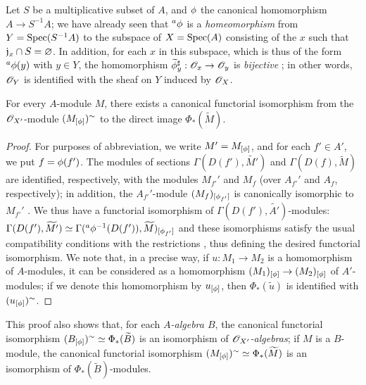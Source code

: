 \begin{example}[1.6.2]
\label{I.1.6.2}
Let $S$ be a multiplicative subset of $A$, and $\phi$ the canonical homomorphism $A\to S^{-1}A$;
we have already seen  that ${}^a\phi$ is a \emph{homeomorphism} from $Y=\operatorname{Spec}(S^{-1}A)$ to the subspace of $X=\operatorname{Spec}(A)$ consisting of the $x$ such that $\mathfrak{j}_x\cap S=\varnothing$.
In addition, for each $x$ in this subspace, which is thus of the form ${}^a\phi(y)$ with $y\in Y$, the homomorphism $\widetilde{\vphi}_y^\sharp:\sh{O}_x\to\sh{O}_y$ is
\emph{bijective} ;
in other words, $\mathscr{O}_Y$ is identified with the sheaf on $Y$ induced by $\mathscr{O}_X$.
\end{example}

\begin{proposition}[1.6.3]
\label{I.1.6.3}
For every $A$-module $M$, there exists a canonical functorial isomorphism from the $\mathscr{O}_{X'}$-module $(M_{[\phi]})^\sim$ to the direct image $\Phi_*(\widetilde{M})$.
\end{proposition}

\begin{proof}
\label{proof-I.1.6.3}
For purposes of abbreviation, we write $M'=M_{[\phi]}$, and for each $f'\in A'$, we put $f=\phi(f')$.
The modules of sections $\Gamma(D(f'),\widetilde{M'})$ and $\Gamma(D(f),\widetilde{M})$ are identified, respectively, with the modules $M_{f'}'$ and $M_f$ (over $A_{f'}'$ and $A_f$, respectively);
in addition, the $A_{f'}'$-module $(M_f)_{[\phi_{f'}]}$ is canonically isomorphic to $M_{f'}'$ .
We thus have a functorial isomorphism of $\Gamma(D(f'),\widetilde{A'})$-modules: $\Gamma(D(f'),\widetilde{M'}) \simeq\Gamma({}^a\phi^{-1}(D(f')),\widetilde{M})_{[\phi_{f'}]}$ and these isomorphisms satisfy the usual compatibility conditions with the restrictions , thus defining the desired functorial isomorphism.
We note that, in a precise way, if $u:M_1\to M_2$ is a homomorphism of $A$-modules, it can be considered as a homomorphism $(M_1)_{[\vphi]}\to(M_2)_{[\vphi]}$ of $A'$-modules;
if we denote this homomorphism by $u_{[\phi]}$, then $\Phi_*(\widetilde{u})$ is identified with $(u_{[\phi]})^\sim$.
\end{proof}

This proof also shows that, for each \emph{$A$-algebra $B$}, the canonical functorial isomorphism
$(B_{[\phi]})^\sim\simeq\Phi_*(\widetilde{B})$ is an isomorphism of \emph{$\mathscr{O}_{X'}$-algebras};
if $M$ is a $B$-module, the canonical functorial isomorphism $(M_{[\phi]})^\sim\simeq\Phi_*(\widetilde{M})$ is an isomorphism of $\Phi_*(\widetilde{B})$-modules.

